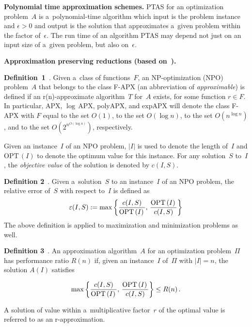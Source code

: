 \begin{multicols}{2}
\noindent
\textbf{Polynomial time approximation schemes.} {PTAS} for an optimization problem~$A$ is
a~polynomial-time algorithm which input is the problem instance and
$\epsilon > 0$ and output is the solution that approximates a~given
problem within the factor of~$\epsilon$. The run time of an
algorithm \mbox{PTAS} may depend not just on an input size of a~given
problem, but also on~$\epsilon$.

\smallskip

\noindent
\textbf{Approximation preserving reductions (based on~\cite{TrevisanLuca}).}

\smallskip

\noindent
\textbf{Definition~1}~\cite{TrevisanLuca}.
Given a~class of functions~$F$, an NP-optimization ({NPO})
problem~$A$  that belongs to the class {F-APX} (an abbreviation
of \textit{approximable}) is defined if an r(n)-approximate algorithm~$T$ for~$A$
exists, for some function $r \in F$. In particular, {APX},
$\log\,${APX}, poly{APX}, and exp{APX} will denote the class
{F-APX} with $F$ equal to the set $O(1)$, to the set $O(\log
n)$, to the set $O(n^{\log n})$, and to the set $O(2^{n^{O(\log
n)}})$, respectively.

\smallskip

Given an instance~$I$ of an {NPO} problem,
$|I|$ is used to denote the length of~$I$ and $\mathrm{OPT}\,(I)$ to denote the optimum
value for this instance. For any solution~$S$ to~$I$, the
\textit{objective value} of the solution is denoted by $c(I,S)$.

\smallskip

\noindent
\textbf{Definition 2}~\cite{TrevisanLuca}.
 Given a~solution~$S$ to an instance~$I$ of an
NPO problem, the relative error of~$S$ with respect
to~$I$ is defined as
$$
\varepsilon(I,S):=\max\left\{\displaystyle\frac{\displaystyle c(I,S)\mathstrut}{\displaystyle \mathrm{OPT}\left(I\right)\mathstrut},\,\displaystyle\frac{\displaystyle \mathrm{OPT}\left(I\right)\mathstrut}{\displaystyle c(I,S)\mathstrut}\right\}
$$
The above definition is applied to maximization and
minimization problems as well.

\smallskip

\noindent
\textbf{Definition 3}~\cite{TrevisanLuca}.
An approximation algorithm~$A$ for an
optimization problem~$\Pi$ has performance ratio $R(n)$ if, given an
instance~$I$ of~$\Pi$ with $|I|=n$, the solution $A(I)$ satisfies

\noindent
$$
\max\left\{\displaystyle\frac{\displaystyle c(I,S)\mathstrut}{\displaystyle \mathrm{OPT}\left(I\right)\mathstrut},\,\displaystyle\frac{\displaystyle \mathrm{OPT}\left(I\right)\mathstrut}{\displaystyle c(I,S)\mathstrut}\right\}
\leq R(n)\,.
$$


 A solution of value within a~multiplicative factor~$r$ of
the optimal value is referred to as an {r-approximation}.


\end{multicols}
